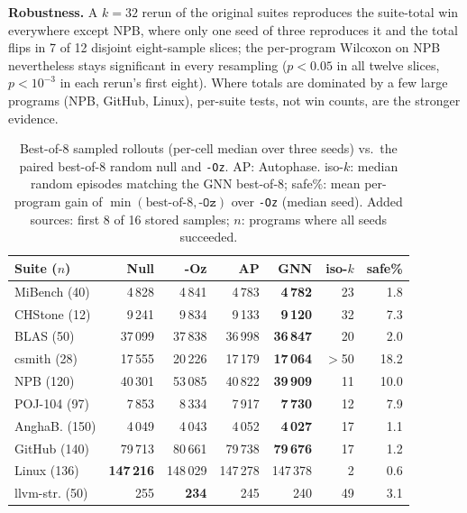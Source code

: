 \documentclass[conference,a4paper]{IEEEtran}
\begin{document}
\textbf{Robustness.} A $k{=}32$ rerun of the original suites
reproduces the suite-total win everywhere except NPB, where only one
seed of three reproduces it and the total flips in 7 of 12 disjoint
eight-sample slices; the per-program Wilcoxon on NPB nevertheless stays
significant in every resampling ($p{<}0.05$ in all twelve slices,
$p{<}10^{-3}$ in each rerun's first eight). Where totals are dominated
by a few large programs (NPB, GitHub, Linux), per-suite tests, not win
counts, are the stronger evidence.

\begin{table}[t]
\caption{Best-of-8 sampled rollouts (per-cell median over three seeds)
vs.\ the paired best-of-8 random null and \texttt{-Oz}. AP: Autophase.
iso-$k$: median random episodes matching the GNN best-of-8; safe\%:
mean per-program gain of $\min(\text{best-of-8},\texttt{-Oz})$ over
\texttt{-Oz} (median seed). Added sources: first 8 of 16 stored
samples; $n$: programs where all seeds succeeded.}
\label{tab:sampling}
\centering
\footnotesize
\setlength{\tabcolsep}{3.5pt}
\begin{tabular}{lrrrrrr}
\toprule
Suite ($n$) & Null & -Oz & AP & GNN & iso-$k$ & safe\% \\
\midrule
MiBench (40) & 4\,828 & 4\,841 & 4\,783 & \textbf{4\,782} & 23 & 1.8 \\
CHStone (12) & 9\,241 & 9\,834 & 9\,133 & \textbf{9\,120} & 32 & 7.3 \\
BLAS (50) & 37\,099 & 37\,838 & 36\,998 & \textbf{36\,847} & 20 & 2.0 \\
csmith (28) & 17\,555 & 20\,226 & 17\,179 & \textbf{17\,064} & $>$50 & 18.2 \\
NPB (120) & 40\,301 & 53\,085 & 40\,822 & \textbf{39\,909} & 11 & 10.0 \\
POJ-104 (97) & 7\,853 & 8\,334 & 7\,917 & \textbf{7\,730} & 12 & 7.9 \\
AnghaB. (150) & 4\,049 & 4\,043 & 4\,052 & \textbf{4\,027} & 17 & 1.1 \\
GitHub (140) & 79\,713 & 80\,661 & 79\,738 & \textbf{79\,676} & 17 & 1.2 \\
Linux (136) & \textbf{147\,216} & 148\,029 & 147\,278 & 147\,378 & 2 & 0.6 \\
llvm-str. (50) & 255 & \textbf{234} & 245 & 240 & 49 & 3.1 \\
\bottomrule
\end{tabular}
\end{table}
\end{document}
